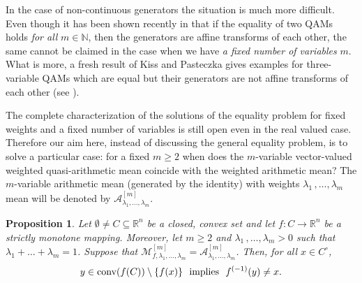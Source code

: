 \documentclass[12pt]{amsart}
\newtheorem{prop}{Proposition}%
\theoremstyle{remark}
\theoremstyle{definition}
\newcommand{\NN}{\mathbb{N}}
\newcommand{\Rn}{\mathbb{R}^n}
\newcommand{\conv}{\mbox{\rm conv}}
\newcommand{\map}{\longrightarrow}
\begin{document}
In the case of non-continuous generators 
the situation is much more difficult. Even though it has been 
shown recently in \cite[Corollary 4.2]{PP26} 
that if the equality of 
two QAMs holds 
{\em for all} $ m \in \NN $, then the generators are 
affine transforms of each other, the same cannot 
be claimed in the case when we have 
{\em a fixed number of variables} $ m $. 
What is more, a fresh result of Kiss and Pasteczka 
gives examples for three-variable 
QAMs which are equal but their 
generators are not affine transforms of each other 
(see \cite[Example 1]{KP26}). 

The complete characterization of the solutions of the 
equality problem for fixed weights and 
a fixed number of variables is 
still open even in the real valued case. 
Therefore our aim here, instead of discussing 
the general equality problem, is to solve a particular 
case: for a fixed $ m \geq 2 $ when does the 
$ m $-variable vector-valued weighted quasi-arithmetic 
mean coincide with the weighted arithmetic mean? 
The $ m $-variable arithmetic mean (generated by 
the identity) with weights 
$ \lambda_1 \,, \dots , \lambda_m $ mean will be 
denoted by 
$ \mathcal{A}_{\lambda_1 , \dots , \lambda_m}^{[m]} $.  

\begin{prop}\label{prop-Application_invinj}
Let $ \emptyset \neq C \subseteq \Rn $ be a 
closed, convex set and let $ f : C \map \Rn $ 
be a strictly monotone mapping. Moreover, 
let $ m \geq 2 $ and $ \lambda_1 \,, \dots , \lambda_m > 0 $ 
such that 
$ \lambda_1 + \dots + \lambda_m = 1 $. 
Suppose that 
$ \mathcal{M}_{f, \lambda_1 , \dots , \lambda_m}^{[m]} 
= \mathcal{A}_{\lambda_1 , \dots , \lambda_m}^{[m]} $. 
Then, for all $ x \in C^{\circ} $, 
\[
y \in \conv (f(C)) \setminus \{ f(x) \} 
\ \mbox{ implies } \ 
f^{(-1)}(y) \neq x .
\]
\end{prop}
\end{document}
